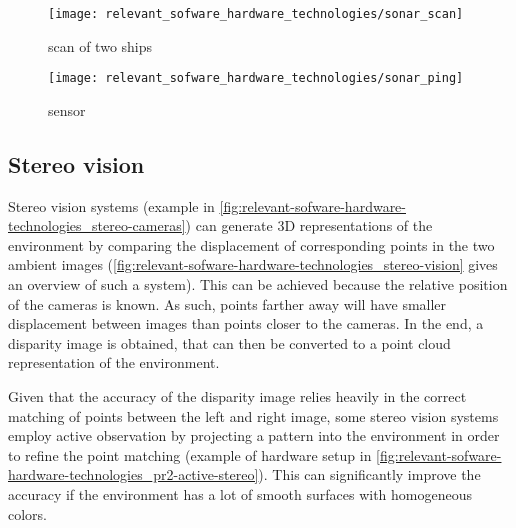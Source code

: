 \begin{savenotes}
\begin{figure}[H]
	\centering
	\begin{minipage}[h]{.47\textwidth}
		\centering
		\texttt{[image: relevant\_sofware\_hardware\_technologies/sonar\_scan]}
		\caption[ scan of two ships]{ scan of two ships\protect\footnotemark}
		\label{fig:relevant-sofware-hardware-technologies_sonar-scan}
	\end{minipage}
	\begin{minipage}[h]{.47\textwidth}
		\centering
		\texttt{[image: relevant\_sofware\_hardware\_technologies/sonar\_ping]}
		\caption[ sensor]{ sensor\protect\footnotemark}
		\label{fig:relevant-sofware-hardware-technologies_sonar-ping}
	\end{minipage}\hfill
\end{figure}
\end{savenotes}


\subsection{Stereo vision}

Stereo vision systems (example in \cref{fig:relevant-sofware-hardware-technologies_stereo-cameras}) can generate 3D representations of the environment by comparing the displacement of corresponding points in the two ambient images (\cref{fig:relevant-sofware-hardware-technologies_stereo-vision} gives an overview of such a system). This can be achieved because the relative position of the cameras is known. As such, points farther away will have smaller displacement between images than points closer to the cameras. In the end, a disparity image is obtained, that can then be converted to a point cloud representation of the environment.

Given that the accuracy of the disparity image relies heavily in the correct matching of points between the left and right image, some stereo vision systems employ active observation by projecting a pattern into the environment in order to refine the point matching (example of hardware setup in \cref{fig:relevant-sofware-hardware-technologies_pr2-active-stereo}). This can significantly improve the accuracy if the environment has a lot of smooth surfaces with homogeneous colors.


